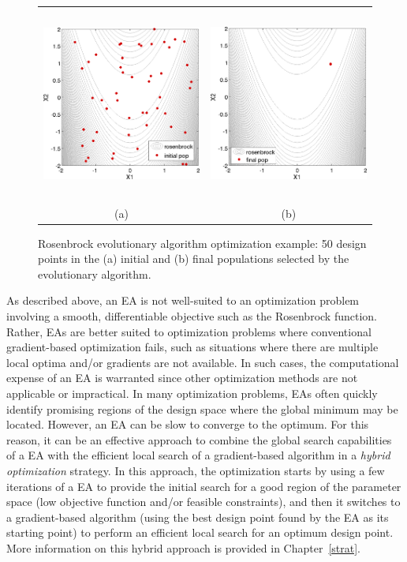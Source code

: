 \begin{figure}[hbt!]
  \centering
  \begin{tabular}{cc}
  \includegraphics[height=2.5in]{images/rosen_ea_init} &
  \includegraphics[height=2.5in]{images/rosen_ea_final} \\
  (a) & (b)
  \end{tabular}
  \caption{Rosenbrock evolutionary algorithm optimization example: 50
    design points in the (a) initial and (b) final populations
    selected by the evolutionary algorithm. }
  \label{opt:examples:rosenbrock_ea_graphics}
\end{figure}

As described above, an EA is not well-suited to an optimization
problem involving a smooth, differentiable objective such as the
Rosenbrock function. Rather, EAs are better suited to optimization
problems where conventional gradient-based optimization fails, such as
situations where there are multiple local optima and/or gradients are
not available. In such cases, the computational expense of an EA is
warranted since other optimization methods are not applicable or
impractical. In many optimization problems, EAs often quickly identify
promising regions of the design space where the global minimum may be
located. However, an EA can be slow to converge to the optimum. For
this reason, it can be an effective approach to combine the global
search capabilities of a EA with the efficient local search of a
gradient-based algorithm in a \emph{hybrid optimization} strategy. In
this approach, the optimization starts by using a few iterations of a
EA to provide the initial search for a good region of the parameter
space (low objective function and/or feasible constraints), and then
it switches to a gradient-based algorithm (using the best design point
found by the EA as its starting point) to perform an efficient local
search for an optimum design point. More information on this hybrid
approach is provided in Chapter~\ref{strat}.

